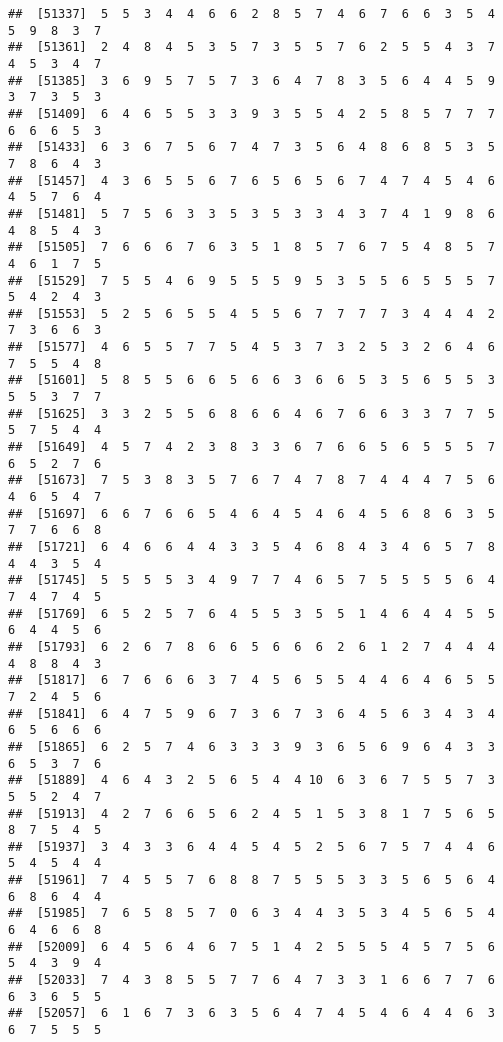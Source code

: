 \documentclass[
]{book}
\begin{document}
\begin{verbatim}
##  [51337]  5  5  3  4  4  6  6  2  8  5  7  4  6  7  6  6  3  5  4  5  9  8  3  7
##  [51361]  2  4  8  4  5  3  5  7  3  5  5  7  6  2  5  5  4  3  7  4  5  3  4  7
##  [51385]  3  6  9  5  7  5  7  3  6  4  7  8  3  5  6  4  4  5  9  3  7  3  5  3
##  [51409]  6  4  6  5  5  3  3  9  3  5  5  4  2  5  8  5  7  7  7  6  6  6  5  3
##  [51433]  6  3  6  7  5  6  7  4  7  3  5  6  4  8  6  8  5  3  5  7  8  6  4  3
##  [51457]  4  3  6  5  5  6  7  6  5  6  5  6  7  4  7  4  5  4  6  4  5  7  6  4
##  [51481]  5  7  5  6  3  3  5  3  5  3  3  4  3  7  4  1  9  8  6  4  8  5  4  3
##  [51505]  7  6  6  6  7  6  3  5  1  8  5  7  6  7  5  4  8  5  7  4  6  1  7  5
##  [51529]  7  5  5  4  6  9  5  5  5  9  5  3  5  5  6  5  5  5  7  5  4  2  4  3
##  [51553]  5  2  5  6  5  5  4  5  5  6  7  7  7  7  3  4  4  4  2  7  3  6  6  3
##  [51577]  4  6  5  5  7  7  5  4  5  3  7  3  2  5  3  2  6  4  6  7  5  5  4  8
##  [51601]  5  8  5  5  6  6  5  6  6  3  6  6  5  3  5  6  5  5  3  5  5  3  7  7
##  [51625]  3  3  2  5  5  6  8  6  6  4  6  7  6  6  3  3  7  7  5  5  7  5  4  4
##  [51649]  4  5  7  4  2  3  8  3  3  6  7  6  6  5  6  5  5  5  7  6  5  2  7  6
##  [51673]  7  5  3  8  3  5  7  6  7  4  7  8  7  4  4  4  7  5  6  4  6  5  4  7
##  [51697]  6  6  7  6  6  5  4  6  4  5  4  6  4  5  6  8  6  3  5  7  7  6  6  8
##  [51721]  6  4  6  6  4  4  3  3  5  4  6  8  4  3  4  6  5  7  8  4  4  3  5  4
##  [51745]  5  5  5  5  3  4  9  7  7  4  6  5  7  5  5  5  5  6  4  7  4  7  4  5
##  [51769]  6  5  2  5  7  6  4  5  5  3  5  5  1  4  6  4  4  5  5  6  4  4  5  6
##  [51793]  6  2  6  7  8  6  6  5  6  6  6  2  6  1  2  7  4  4  4  4  8  8  4  3
##  [51817]  6  7  6  6  6  3  7  4  5  6  5  5  4  4  6  4  6  5  5  7  2  4  5  6
##  [51841]  6  4  7  5  9  6  7  3  6  7  3  6  4  5  6  3  4  3  4  6  5  6  6  6
##  [51865]  6  2  5  7  4  6  3  3  3  9  3  6  5  6  9  6  4  3  3  6  5  3  7  6
##  [51889]  4  6  4  3  2  5  6  5  4  4 10  6  3  6  7  5  5  7  3  5  5  2  4  7
##  [51913]  4  2  7  6  6  5  6  2  4  5  1  5  3  8  1  7  5  6  5  8  7  5  4  5
##  [51937]  3  4  3  3  6  4  4  5  4  5  2  5  6  7  5  7  4  4  6  5  4  5  4  4
##  [51961]  7  4  5  5  7  6  8  8  7  5  5  5  3  3  5  6  5  6  4  6  8  6  4  4
##  [51985]  7  6  5  8  5  7  0  6  3  4  4  3  5  3  4  5  6  5  4  6  4  6  6  8
##  [52009]  6  4  5  6  4  6  7  5  1  4  2  5  5  5  4  5  7  5  6  5  4  3  9  4
##  [52033]  7  4  3  8  5  5  7  7  6  4  7  3  3  1  6  6  7  7  6  6  3  6  5  5
##  [52057]  6  1  6  7  3  6  3  5  6  4  7  4  5  4  6  4  4  6  3  6  7  5  5  5

\end{verbatim}
\end{document}
